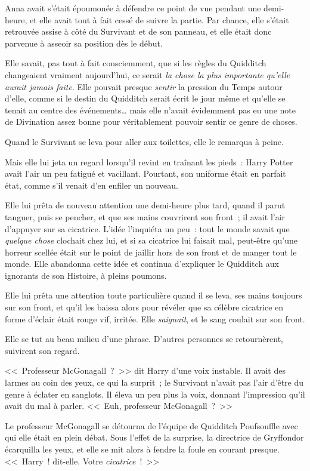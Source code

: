 Anna avait s'était époumonée à défendre ce point de vue pendant une demi-heure, et elle avait tout à fait cessé de suivre la partie. Par chance, elle s'était retrouvée assise à côté du Survivant et de son panneau, et elle était donc parvenue à asseoir sa position dès le début.

Elle savait, pas tout à fait consciemment, que si les règles du Quidditch changeaient vraiment aujourd'hui, ce serait \emph{la chose la plus importante qu'elle aurait jamais faite}. Elle pouvait presque \emph{sentir} la pression du Temps autour d'elle, comme si le destin du Quidditch serait écrit le jour même et qu'elle se tenait au centre des événements… mais elle n'avait évidemment pas eu une note de Divination assez bonne pour véritablement pouvoir sentir ce genre de choses.

Quand le Survivant se leva pour aller aux toilettes, elle le remarqua à peine.

Mais elle lui jeta un regard lorsqu'il revint en traînant les pieds~: Harry Potter avait l'air un peu fatigué et vacillant. Pourtant, son uniforme était en parfait état, comme s'il venait d'en enfiler un nouveau.

Elle lui prêta de nouveau attention une demi-heure plus tard, quand il parut tanguer, puis se pencher, et que ses mains couvrirent son front~; il avait l'air d'appuyer sur sa cicatrice. L'idée l'inquiéta un peu~: tout le monde savait que \emph{quelque chose} clochait chez lui, et si sa cicatrice lui faisait mal, peut-être qu'une horreur scellée était sur le point de jaillir hors de son front et de manger tout le monde. Elle abandonna cette idée et continua d'expliquer le Quidditch aux ignorants de son Histoire, à pleins poumons.

Elle lui prêta une attention toute particulière quand il se leva, ses mains toujours sur son front, et qu'il les baissa alors pour révéler que sa célèbre cicatrice en forme d'éclair était rouge vif, irritée. Elle \emph{saignait}, et le sang coulait sur son front.

Elle se tut au beau milieu d'une phrase. D'autres personnes se retournèrent, suivirent son regard.

<<~Professeur McGonagall~?~>> dit Harry d'une voix instable. Il avait des larmes au coin des yeux, ce qui la surprit~; le Survivant n'avait pas l'air d'être du genre à éclater en sanglots. Il éleva un peu plus la voix, donnant l'impression qu'il avait du mal à parler. <<~Euh, professeur McGonagall~?~>>

Le professeur McGonagall se détourna de l'équipe de Quidditch Poufsouffle avec qui elle était en plein débat. Sous l'effet de la surprise, la directrice de Gryffondor écarquilla les yeux, et elle se mit alors à fendre la foule en courant presque. <<~Harry~! dit-elle. Votre \emph{cicatrice}~!~>>

